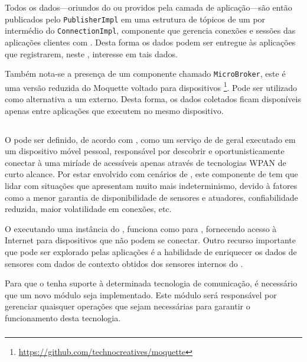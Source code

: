 Todos os dados---oriundos do \stwopa ou providos pela camada de aplicação---são então publicados pelo \texttt{PublisherImpl} em uma estrutura de tópicos de um \broker \mqtt por intermédio do \texttt{ConnectionImpl}, componente que gerencia conexões e sessões das aplicações clientes com \brokers.
Desta forma os dados podem ser entregue às aplicações que registrarem, neste \broker, interesse em tais dados.

Também nota-se a presença de um componente chamado \texttt{MicroBroker}, este é uma versão reduzida do \broker \mqtt Moquette voltado para dispositivos \android\footnote{\url{https://github.com/technocreatives/moquette}}. Pode ser utilizado como alternativa a um \broker externo. Desta forma, os dados coletados ficam disponíveis apenas entre aplicações que executem no mesmo dispositivo.

\subsection{\mhub}

O \middleware \mhub pode ser definido, de acordo com , como um serviço de \middleware de \iomt geral executado em um dispositivo móvel pessoal, responsável por descobrir e oportunisticamente conectar à uma miríade de \smartobjs acessíveis apenas através de tecnologias WPAN de curto alcance. Por estar envolvido com cenários de \iomt, este componente de \software tem que lidar com situações que apresentam muito mais indeterminismo, devido à fatores como a menor garantia de disponibilidade de sensores e atuadores, confiabilidade reduzida, maior volatilidade em conexões, etc.

O \smartphone executando uma instância do \mhub, funciona como \gateway para \smartobjs, fornecendo acesso à Internet para dispositivos que não podem se conectar. Outro recurso importante que pode ser explorado pelas aplicações é a habilidade de enriquecer os dados de sensores com dados de contexto obtidos dos sensores internos do \mhub.

Para que o \mhub tenha suporte à determinada tecnologia de comunicação, é necessário que um novo módulo seja implementado. Este módulo será responsável por gerenciar quaisquer operações que sejam necessárias para garantir o funcionamento desta tecnologia.

\subsubsection{\stwopa} \label{subsub:s2pa}

